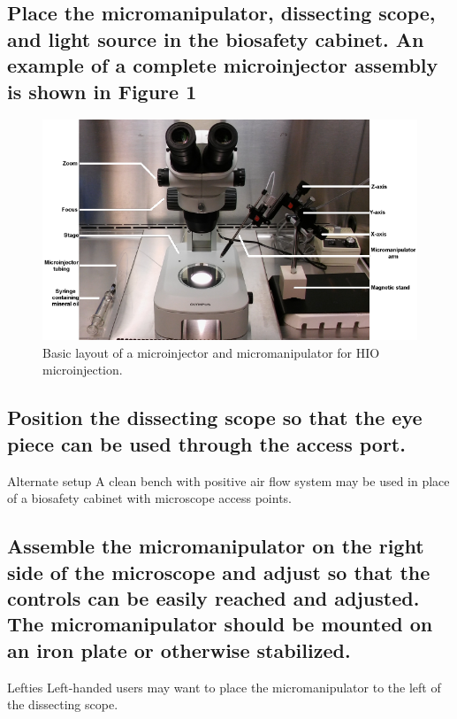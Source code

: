 \documentclass[11pt]{article}
\begin{document}
\subsection{{\bfseries\sffamily } Place the micromanipulator, dissecting scope, and light source in the biosafety cabinet. An example of a complete microinjector assembly is shown in \textbf{Figure 1}}
\label{sec:orgheadline2}
\begin{figure}
\centering
\includegraphics[width=0.9\linewidth]{./img/figure1.pdf}
\caption{Basic layout of a microinjector and micromanipulator for HIO microinjection.}
\end{figure}
\subsection{{\bfseries\sffamily } Position the dissecting scope so that the eye piece can be used through the access port.}
\label{sec:orgheadline3}
\begin{bclogo}[logo=\bcinfo, couleurBarre=Black, noborder=true, couleur=gray!10]{     Alternate setup}
A clean bench with positive air flow system may be used in place of a biosafety cabinet with microscope access points.\\
\end{bclogo}
\subsection{{\bfseries\sffamily } Assemble the micromanipulator on the right side of the microscope and adjust so that the controls can be easily reached and adjusted. The micromanipulator should be mounted on an iron plate or otherwise stabilized.}
\label{sec:orgheadline4}
\begin{bclogo}[logo=\bcinfo, couleurBarre=Black, noborder=true, couleur=gray!10]{     Lefties}
Left-handed users may want to place the micromanipulator to the left of the dissecting scope.\\
\end{bclogo}
\end{document}
